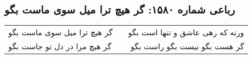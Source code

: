 \begin{center}
\section*{رباعی شماره ۱۵۸۰: گر هیچ ترا میل سوی ماست بگو}
\label{sec:1580}
\begin{longtable}{l p{0.5cm} r}
گر هیچ ترا میل سوی ماست بگو
&&
ورنه که رهی عاشق و تنها است بگو
\\
گر هیچ مرا در دل تو جاست بگو
&&
گر هست بگو نیست بگو راست بگو
\\
\end{longtable}
\end{center}
